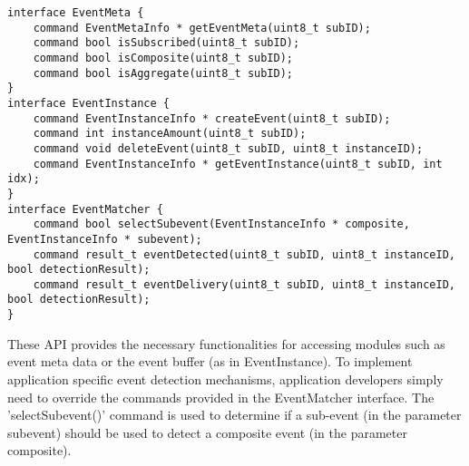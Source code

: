 \begin{lstlisting}[caption=API provided by PSWare, label=lst:pswareAPI]
interface EventMeta {
	command EventMetaInfo * getEventMeta(uint8_t subID);
	command bool isSubscribed(uint8_t subID);
	command bool isComposite(uint8_t subID);
	command bool isAggregate(uint8_t subID);
}
interface EventInstance {
	command EventInstanceInfo * createEvent(uint8_t subID);
	command int instanceAmount(uint8_t subID);
	command void deleteEvent(uint8_t subID, uint8_t instanceID);
	command EventInstanceInfo * getEventInstance(uint8_t subID, int idx);
}
interface EventMatcher {
	command bool selectSubevent(EventInstanceInfo * composite, EventInstanceInfo * subevent);
	command result_t eventDetected(uint8_t subID, uint8_t instanceID, bool detectionResult);
	command result_t eventDelivery(uint8_t subID, uint8_t instanceID, bool detectionResult);
}
\end{lstlisting}

These API provides the necessary functionalities for accessing modules such as event meta data or the event buffer (as in EventInstance). To implement application specific event detection mechanisms, application developers simply need to override the commands provided in the EventMatcher interface. The 'selectSubevent()' command is used to determine if a sub-event (in the parameter subevent) should be used to detect a composite event (in the parameter composite).